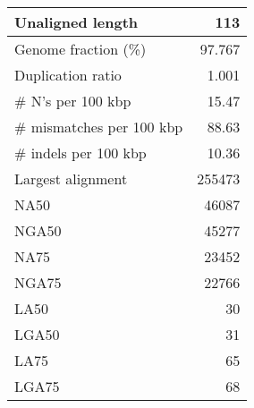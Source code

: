 \documentclass[12pt,a4paper]{article}
\begin{document}
\begin{table}[ht]
\begin{center}
\begin{tabular}{|l*{1}{|r}|}
Unaligned length & 113 \\ \hline
Genome fraction (\%) & 97.767 \\ \hline
Duplication ratio & 1.001 \\ \hline
\# N's per 100 kbp & 15.47 \\ \hline
\# mismatches per 100 kbp & 88.63 \\ \hline
\# indels per 100 kbp & 10.36 \\ \hline
Largest alignment & 255473 \\ \hline
NA50 & 46087 \\ \hline
NGA50 & 45277 \\ \hline
NA75 & 23452 \\ \hline
NGA75 & 22766 \\ \hline
LA50 & 30 \\ \hline
LGA50 & 31 \\ \hline
LA75 & 65 \\ \hline
LGA75 & 68 \\ \hline
\end{tabular}
\end{center}
\end{table}
\end{document}
